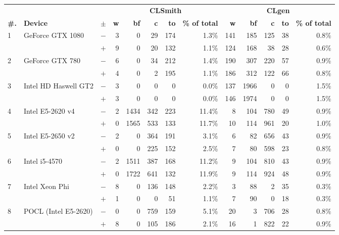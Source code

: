   \begin{tabular}{lll | rrrrr | rrrrr }
  \toprule
  & & & \multicolumn{5}{c|}{\textbf{CLSmith}} & \multicolumn{5}{c}{\textbf{CLgen}} \\
  \textbf{\#.} & \textbf{Device} & $\pm$ &
  \textbf{w} & \textbf{bf} & \textbf{c} & \textbf{to} & \textbf{\% of total} &
  \textbf{w} & \textbf{bf} & \textbf{c} & \textbf{to} & \textbf{\% of total} \\
  \midrule
  \multirow{ 2}{*}{1} & \multirow{ 2}{*}{GeForce GTX 1080} & $-$ & 3 & 0 & 29 & 174 & 1.3\%       & 141 & 185 & 125 & 38 & 0.8\% \\& & $+$ & 9 & 0 & 20 & 132 & 1.1\% & 124 & 168 & 38 & 28 & 0.6\% \\
\hline
\multirow{ 2}{*}{2} & \multirow{ 2}{*}{GeForce GTX 780} & $-$ & 6 & 0 & 34 & 212 & 1.4\%       & 190 & 307 & 220 & 57 & 0.9\% \\& & $+$ & 4 & 0 & 2 & 195 & 1.1\% & 186 & 312 & 122 & 66 & 0.8\% \\
\hline
\multirow{ 2}{*}{3} & \multirow{ 2}{*}{Intel HD Haswell GT2} & $-$ & 3 & 0 & 0 & 0 & 0.0\%       & 137 & 1966 & 0 & 0 & 1.5\% \\& & $+$ & 3 & 0 & 0 & 0 & 0.0\% & 146 & 1974 & 0 & 0 & 1.5\% \\
\hline
\multirow{ 2}{*}{4} & \multirow{ 2}{*}{Intel E5-2620 v4} & $-$ & 2 & 1434 & 342 & 223 & 11.4\%       & 8 & 104 & 780 & 49 & 0.9\% \\& & $+$ & 0 & 1565 & 533 & 133 & 11.7\% & 10 & 114 & 961 & 20 & 1.0\% \\
\hline
\multirow{ 2}{*}{5} & \multirow{ 2}{*}{Intel E5-2650 v2} & $-$ & 2 & 0 & 364 & 191 & 3.1\%       & 6 & 82 & 656 & 43 & 0.9\% \\& & $+$ & 0 & 0 & 225 & 152 & 2.5\% & 7 & 80 & 598 & 23 & 0.8\% \\
\hline
\multirow{ 2}{*}{6} & \multirow{ 2}{*}{Intel i5-4570} & $-$ & 2 & 1511 & 387 & 168 & 11.2\%       & 9 & 104 & 810 & 43 & 0.9\% \\& & $+$ & 0 & 1722 & 641 & 132 & 11.9\% & 9 & 114 & 924 & 48 & 0.9\% \\
\hline
\multirow{ 2}{*}{7} & \multirow{ 2}{*}{Intel Xeon Phi} & $-$ & 8 & 0 & 136 & 148 & 2.2\%       & 3 & 88 & 2 & 35 & 0.3\% \\& & $+$ & 1 & 0 & 0 & 51 & 1.1\% & 7 & 90 & 0 & 18 & 0.3\% \\
\hline
\multirow{ 2}{*}{8} & \multirow{ 2}{*}{POCL (Intel E5-2620)} & $-$ & 0 & 0 & 759 & 159 & 5.1\%       & 20 & 3 & 706 & 28 & 0.8\% \\& & $+$ & 8 & 0 & 105 & 186 & 2.1\% & 16 & 1 & 822 & 22 & 0.9\% \\

\end{tabular}
